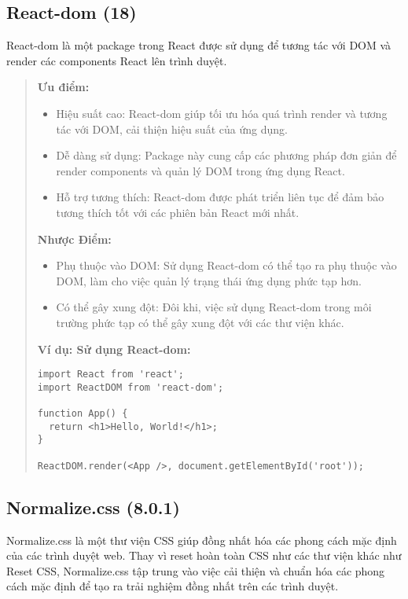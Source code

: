 \subsection{React-dom (18)}

React-dom là một package trong React được sử dụng để tương tác với DOM và render các components React lên trình duyệt.

\begin{quote}
\textbf{Ưu điểm:}
\begin{itemize}
  \item Hiệu suất cao: React-dom giúp tối ưu hóa quá trình render và tương tác với DOM, cải thiện hiệu suất của ứng dụng.
  \item Dễ dàng sử dụng: Package này cung cấp các phương pháp đơn giản để render components và quản lý DOM trong ứng dụng React.
  \item Hỗ trợ tương thích: React-dom được phát triển liên tục để đảm bảo tương thích tốt với các phiên bản React mới nhất.
\end{itemize}

\textbf{Nhược Điểm:}
\begin{itemize}
  \item Phụ thuộc vào DOM: Sử dụng React-dom có thể tạo ra phụ thuộc vào DOM, làm cho việc quản lý trạng thái ứng dụng phức tạp hơn.
  \item Có thể gây xung đột: Đôi khi, việc sử dụng React-dom trong môi trường phức tạp có thể gây xung đột với các thư viện khác.
\end{itemize}

\textbf{Ví dụ: Sử dụng React-dom:}
\begin{lstlisting}
import React from 'react';
import ReactDOM from 'react-dom';

function App() {
  return <h1>Hello, World!</h1>;
}

ReactDOM.render(<App />, document.getElementById('root'));
\end{lstlisting}
\end{quote}



\subsection{Normalize.css (8.0.1)}

Normalize.css là một thư viện CSS giúp đồng nhất hóa các phong cách mặc định của các trình duyệt web. Thay vì reset hoàn toàn CSS như các thư viện khác như Reset CSS, Normalize.css tập trung vào việc cải thiện và chuẩn hóa các phong cách mặc định để tạo ra trải nghiệm đồng nhất trên các trình duyệt.

